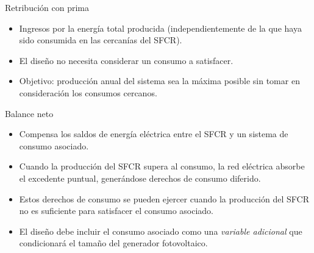\documentclass[xcolor={usenames,svgnames,dvipsnames}]{beamer}
\begin{document}
\begin{frame}[label={sec:org572a9ea}]{Retribución con prima}
\begin{itemize}
\item \alert{Ingresos} por la \alert{energía total producida} (independientemente de la que
haya sido consumida en las cercanías del SFCR).

\item El diseño \alert{no necesita considerar un consumo} a satisfacer.

\item \alert{Objetivo}: producción anual del sistema sea la máxima posible sin
tomar en consideración los consumos cercanos.
\end{itemize}
\end{frame}

\begin{frame}[label={sec:org990061d}]{Balance neto}
\begin{itemize}
\item \alert{Compensa los saldos de energía eléctrica} entre el SFCR y un sistema de consumo asociado.

\item Cuando la producción del SFCR supera al consumo, la red eléctrica absorbe el excedente puntual, generándose derechos de consumo diferido.

\item Estos derechos de consumo se pueden ejercer cuando la producción del SFCR no es suficiente para satisfacer el consumo asociado.

\item El \alert{diseño debe incluir el consumo asociado} como una \emph{variable adicional} que condicionará el tamaño del generador fotovoltaico.
\end{itemize}
\end{frame}
\end{document}
